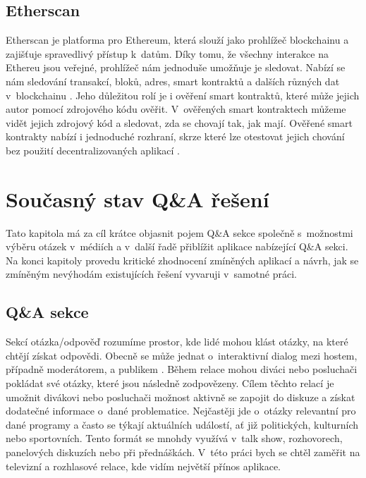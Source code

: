 \section{Etherscan}
Etherscan je platforma pro Ethereum, která slouží jako prohlížeč blockchainu a zajišťuje spravedlivý přístup k~datům. Díky tomu, že všechny interakce na Ethereu jsou veřejné, prohlížeč nám jednoduše umožňuje je sledovat. Nabízí se nám sledování transakcí, bloků, adres, smart kontraktů a dalších různých dat v~blockchainu \cite{binance_etherscan}. Jeho důležitou rolí je i ověření smart kontraktů, které může jejich autor pomocí zdrojového kódu ověřit. V~ověřených smart kontraktech můžeme vidět jejich zdrojový kód a sledovat, zda se chovají tak, jak mají. Ověřené smart kontrakty nabízí i jednoduché rozhraní, skrze které lze otestovat jejich chování bez použití decentralizovaných aplikací \cite{etherscan}.

\chapter{Současný stav Q\&A řešení}
\label{chapter:5}
Tato kapitola má za cíl krátce objasnit pojem Q\&A sekce společně s~možnostmi výběru otázek v~médiích a v~další řadě přiblížit aplikace nabízející Q\&A sekci. Na konci kapitoly provedu kritické zhodnocení zmíněných aplikací a návrh, jak se zmíněným nevýhodám existujících řešení vyvaruji v~samotné práci. 

\section{Q\&A sekce}
Sekcí otázka/odpověď rozumíme prostor, kde lidé mohou klást otázky, na které chtějí získat odpovědi. Obecně se může jednat o~interaktivní dialog mezi hostem, případně moderátorem, a publikem \cite{slidoqa}. Během relace mohou diváci nebo posluchači pokládat své otázky, které jsou následně zodpovězeny. Cílem těchto relací je umožnit divákovi nebo posluchači možnost aktivně se zapojit do diskuze a získat dodatečné informace o~dané problematice. Nejčastěji jde o~otázky relevantní pro dané programy a často se týkají aktuálních událostí, ať již politických, kulturních nebo sportovních. Tento formát se mnohdy využívá v~talk show, rozhovorech, panelových diskuzích nebo při přednáškách. V~této práci bych se chtěl zaměřit na televizní a rozhlasové relace, kde vidím největší přínos aplikace. 


